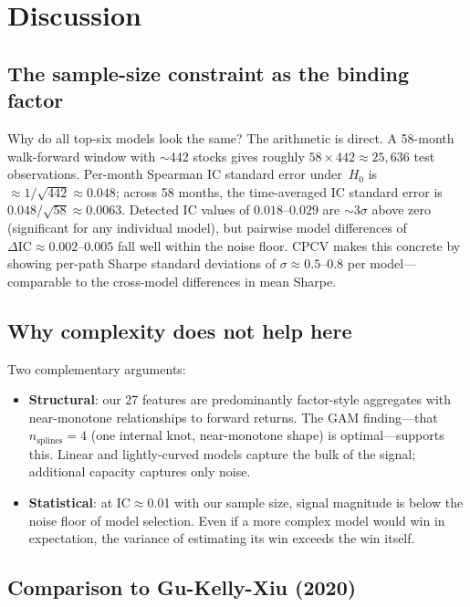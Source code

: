 \documentclass[11pt]{article}
\begin{document}
\section{Discussion}\label{sec:discussion}

\subsection{The sample-size constraint as the binding factor}

Why do all top-six models look the same? The arithmetic is direct.
A 58-month walk-forward window with $\sim$442 stocks gives roughly
$58 \times 442 \approx 25{,}636$ test observations. Per-month Spearman
IC standard error under~$H_0$ is $\approx 1/\sqrt{442} \approx 0.048$;
across 58 months, the time-averaged IC standard error is
$0.048/\sqrt{58} \approx 0.0063$. Detected IC values of $0.018$--$0.029$
are $\sim 3\sigma$ above zero (significant for any individual model),
but pairwise model differences of $\Delta\text{IC} \approx 0.002$--$0.005$
fall well within the noise floor. CPCV makes this concrete by showing
per-path Sharpe standard deviations of $\sigma\approx 0.5$--$0.8$ per
model---comparable to the cross-model differences in mean Sharpe.

\subsection{Why complexity does not help here}

Two complementary arguments:
\begin{itemize}[leftmargin=2em,topsep=2pt,itemsep=2pt]
\item \textbf{Structural}: our 27 features are predominantly
  factor-style aggregates with near-monotone relationships to forward
  returns. The GAM finding---that $n_{\text{splines}}=4$ (one internal
  knot, near-monotone shape) is optimal---supports this. Linear and
  lightly-curved models capture the bulk of the signal; additional
  capacity captures only noise.
\item \textbf{Statistical}: at IC$\approx$0.01 with our sample size,
  signal magnitude is below the noise floor of model selection. Even
  if a more complex model would win in expectation, the variance of
  estimating its win exceeds the win itself.
\end{itemize}

\subsection{Comparison to Gu-Kelly-Xiu (2020)}
\end{document}
